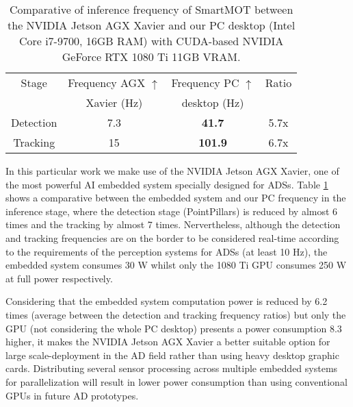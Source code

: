 \begin{table}[h]
	\captionsetup{justification=justified}
	\caption[Comparative of inference frequency of SmartMOT between the NVIDIA Jetson AGX Xavier and our PC desktop]{Comparative of inference frequency of SmartMOT between the NVIDIA Jetson AGX Xavier and our PC desktop (Intel Core i7-9700, 16GB RAM) with CUDA-based NVIDIA GeForce RTX 1080 Ti 11GB VRAM.}
	\label{table:4_smartmot_xavier_vs_computer_hz}
	\begin{center}
		\begin{tabular}{ c | c c c}
			\toprule
			Stage & Frequency AGX $\uparrow$ &  Frequency PC $\uparrow$ & Ratio \\
			& Xavier (Hz) & desktop (Hz) & \\
			\midrule
			Detection & 7.3 & \bf{41.7} & 5.7x \\
			\hline
			Tracking & 15 & \bf{101.9} & 6.7x \\
			\bottomrule
		\end{tabular}
	\end{center}
\end{table}

In this particular work we make use of the NVIDIA Jetson AGX Xavier, one of the most powerful \ac{AI} embedded system specially designed for \acp{ADS}. Table \ref{table:4_smartmot_xavier_vs_computer_hz} shows a comparative between the embedded system and our PC frequency in the inference stage, where the detection stage (PointPillars) is reduced by almost 6 times and the tracking by almost 7 times. Nervertheless, although the detection and tracking frequencies are on the border to be considered real-time according to the requirements of the perception systems for \acp{ADS} (at least 10 Hz), the embedded system consumes 30 W whilst only the 1080 Ti GPU consumes 250 W at full power respectively. 

Considering that the embedded system computation power is reduced by 6.2 times (average between the detection and tracking frequency ratios) but only the \ac{GPU} (not considering the whole PC desktop) presents a power consumption 8.3 higher, it makes the NVIDIA Jetson AGX Xavier a better suitable option for large scale-deployment in the \ac{AD} field rather than using heavy desktop graphic cards. Distributing several sensor processing across multiple embedded systems for parallelization will result in lower power consumption than using conventional \acp{GPU} in future \ac{AD} prototypes. 

